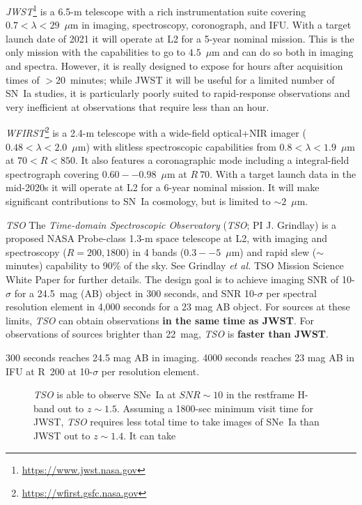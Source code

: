 \documentclass[12pt,preprint]{aastex}
\newcommand{\snia}{SN~Ia\xspace}
\newcommand{\sneia}{SNe~Ia\xspace}
\begin{document}
{\it JWST}\footnote{\url{https://www.jwst.nasa.gov}} is a 6.5-m telescope with a rich instrumentation suite covering $0.7<\lambda<29$~$\mu$m in imaging, spectroscopy, coronograph, and IFU.  With a target launch date of 2021 it will operate at L2 for a 5-year nominal mission.  This is the only mission with the capabilities to go to $4.5$~$\mu$m and can do so both in imaging and spectra.  However, it is really designed to expose for hours after acquisition times of $>20$~minutes; while JWST it will be useful for a limited number of \snia studies, it is particularly poorly suited to rapid-response observations and very inefficient at observations that require less than an hour.

{\it WFIRST}\footnote{\url{https://wfirst.gsfc.nasa.gov}} is a 2.4-m telescope with a wide-field optical+NIR imager ($0.48<\lambda<2.0$~$\mu$m) with slitless spectroscopic capabilities from $0.8<\lambda<1.9$~$\mu$m at $70<R<850$.  It also features a coronagraphic mode including a integral-field spectrograph covering $0.60--0.98$~$\mu$m at $R~70$.  With a target launch data in the mid-2020s it will operate at L2 for a 6-year nominal mission.  It will make significant contributions to \snia cosmology, but is limited to $\sim2$~$\mu$m.

{\it TSO}
The {\it Time-domain Spectroscopic Observatory} ({\it TSO}; PI J. Grindlay) is a proposed NASA Probe-class 1.3-m space telescope at L2, with imaging and spectroscopy ($R=200, 1800$) in 4 bands ($0.3--5$~$\mu$m) and rapid slew ($\sim$minutes) capability to 90\% of the sky.  See Grindlay {\it et al.} TSO Mission Science White Paper for further details.  The design goal is to achieve imaging SNR of 10-$\sigma$ for a 24.5~mag (AB) object in 300 seconds, and SNR 10-$\sigma$ per spectral resolution element in 4,000 seconds for a 23 mag AB object.  For sources at these limits, {\it TSO} can obtain observations {\bf in the same time as JWST}.  For observations of sources brighter than 22~mag, {\it TSO} is {\bf faster than JWST}.


300 seconds reaches 24.5 mag AB in imaging.
4000 seconds reaches 23 mag AB in IFU at R~200 at 10-$\sigma$ per resolution element.

\begin{figure}
\caption{{\it TSO} is able to observe \sneia at $SNR\sim10$ in the restframe H-band out to $z\sim1.5$.  Assuming a 1800-sec minimum visit time for JWST, {\it TSO} requires less total time to take images of \sneia than JWST out to $z\sim1.4$.  It can take
    \label{fig:tso_jwst}
}

\end{figure}
\end{document}
